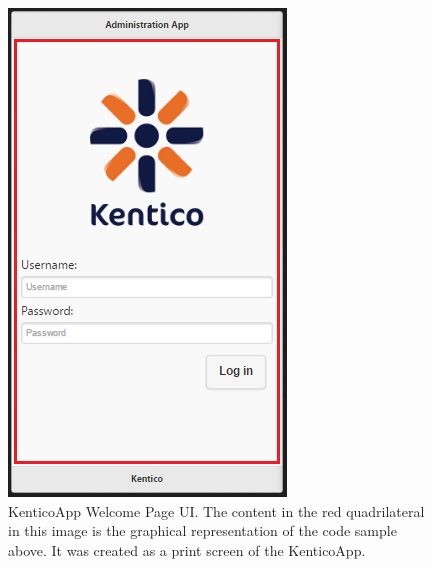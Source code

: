 \begin{figure}
  \includegraphics[width=\textwidth/2]{Images/WelcomePageIllustration.png}
  \caption{KenticoApp Welcome Page UI. The content in the red quadrilateral in this image is the graphical representation of the code sample above. It was created as a print screen of the KenticoApp.}
  \label{WelcomePageIllustration}
\end{figure}
